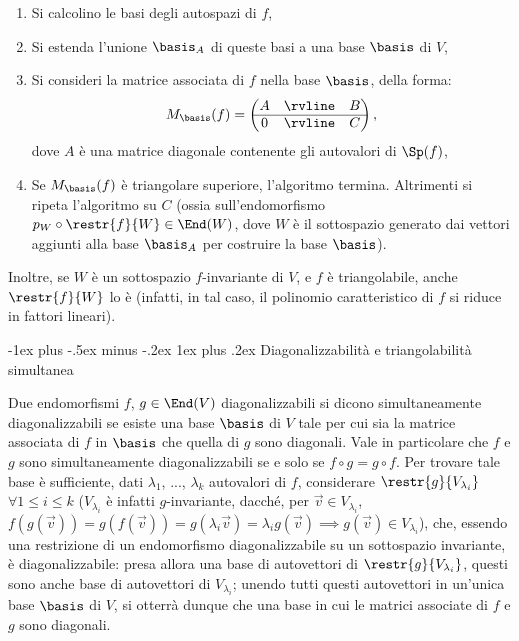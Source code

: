 \documentclass[10pt,landscape]{article}
\makeatletter
\renewcommand{\subsubsection}{\@startsection{subsubsection}{3}{0mm}%
	{-1ex plus -.5ex minus -.2ex}%
	{1ex plus .2ex}%
	{\normalfont\small\bfseries}}
\makeatother
\begin{document}
\begin{multicols}{3}
		\begin{enumerate}
			\itemsep 0pt
			\item Si calcolino le basi degli autospazi di $f$,
			\item Si estenda l'unione $\basis_A$ di queste basi a una base $\basis$ di $V$,
			\item Si consideri la matrice associata di $f$ nella base $\basis$, della forma: \setlength{\extrarowheight}{1.3pt}
			\[M_\basis(f) = \begin{pmatrix}
				A
				& \rvline & B \\
				\hline
				0 & \rvline &
				C
			\end{pmatrix}, \]\setlength{\extrarowheight}{0pt}dove $A$ è una matrice diagonale contenente gli autovalori di $\Sp(f)$,
			\item Se $M_\basis(f)$ è triangolare superiore, l'algoritmo termina. Altrimenti si ripeta l'algoritmo su $C$ (ossia sull'endomorfismo $p_W \circ \restr{f}{W} \in \End(W)$, dove $W$ è il sottospazio generato dai vettori aggiunti alla base $\basis_A$ per costruire la base $\basis$).
		\end{enumerate}
	
		Inoltre, se $W$ è un sottospazio $f$-invariante di $V$,
		e $f$ è triangolabile, anche $\restr{f}{W}$ lo è (infatti,
		in tal caso, il polinomio caratteristico di $f$ si riduce
		in fattori lineari).
		
		\subsubsection{Diagonalizzabilità e triangolabilità simultanea}

		Due endomorfismi $f$, $g \in \End(V)$ diagonalizzabili si dicono simultaneamente diagonalizzabili se esiste una base $\basis$ di $V$
		tale per cui sia la matrice associata di $f$ in $\basis$ che quella
		di $g$ sono diagonali. Vale in particolare che $f$ e $g$ sono
		simultaneamente diagonalizzabili se e solo se $f \circ g = g \circ f$.
		Per trovare tale base è sufficiente, dati $\lambda_1$, ...,
		$\lambda_k$ autovalori di $f$, considerare $\restr{g}{V_{\lambda_i}}$
		$\forall 1 \leq i \leq k$ ($V_{\lambda_i}$ è infatti $g$-invariante,
		dacché, per $\vec{v} \in V_{\lambda_i}$, $f(g(\vec{v})) =
		g(f(\vec{v})) = g(\lambda_i \vec{v}) = \lambda_i g(\vec{v}) \implies
		g(\vec{v}) \in V_{\lambda_i}$), che, essendo una restrizione di
		un endomorfismo diagonalizzabile su un sottospazio invariante, è diagonalizzabile: presa allora
		una base di autovettori di $\restr{g}{V_{\lambda_i}}$, questi sono
		anche base di autovettori di $V_{\lambda_i}$; unendo tutti questi
		autovettori in un'unica base $\basis$ di $V$, si otterrà dunque
		che una base in cui le matrici associate di $f$ e $g$ sono diagonali.
		

\end{multicols}
\end{document}
